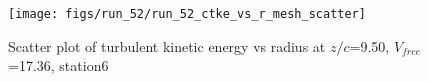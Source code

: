 \begin{figure}[H]
\centering
\texttt{[image: figs/run\_52/run\_52\_ctke\_vs\_r\_mesh\_scatter]}
\caption{Scatter plot of turbulent kinetic energy vs radius at $z/c$=9.50, $V_{free}$=17.36, station6}
\label{fig:run_52_ctke_vs_r_mesh_scatter}
\end{figure}


